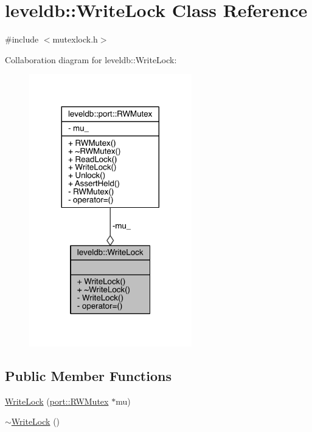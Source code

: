 \hypertarget{classleveldb_1_1_write_lock}{}\section{leveldb\+:\+:Write\+Lock Class Reference}
\label{classleveldb_1_1_write_lock}


{\ttfamily \#include $<$mutexlock.\+h$>$}



Collaboration diagram for leveldb\+:\+:Write\+Lock\+:\nopagebreak
\begin{figure}[H]
\begin{center}
\leavevmode
\includegraphics[width=200pt]{classleveldb_1_1_write_lock__coll__graph}
\end{center}
\end{figure}
\subsection*{Public Member Functions}
\begin{DoxyCompactItemize}
\item 
\hyperlink{classleveldb_1_1_write_lock_a11fc79d58e89802b45e287c1bf2982b3}{Write\+Lock} (\hyperlink{classleveldb_1_1port_1_1_r_w_mutex}{port\+::\+R\+W\+Mutex} $\ast$mu)
\item 
\hyperlink{classleveldb_1_1_write_lock_aa9399545839425975d28a1692b5daaed}{$\sim$\+Write\+Lock} ()
\end{DoxyCompactItemize}

